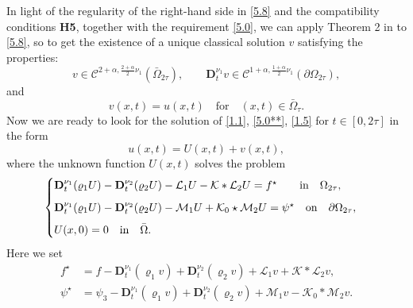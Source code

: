 \documentclass[reqno]{amsart}
\def\C {\mathcal{C}}
\theoremstyle{definition}
\numberwithin{equation}{section}
\begin{document}
In light of the regularity of the right-hand side in \eqref{5.8} and 
the compatibility conditions \textbf{H5},
together with the requirement \eqref{5.0}, we can apply Theorem 2 in \cite{K1} to \eqref{5.8},
so to get the existence of a unique classical solution $v$ satisfying the properties:
\[
v\in\C^{2+\alpha,\frac{2+\alpha}{2}\nu_{1}}(\bar{\Omega}_{2\tau}),\qquad \mathbf{D}_{t}^{\nu_{1}}v\in\C^{1+\alpha,\frac{1+\alpha}{2}\nu_{1}}(\partial\Omega_{2\tau}),
\]
and
\[
v(x,t)= u(x,t)\quad\text{for}\quad (x,t)\in\bar{\Omega}_{\tau}.
\]
Now we are ready to look for the solution of \eqref{1.1}, \eqref{5.0**}, \eqref{1.5} for $t\in[0,2\tau]$ in the form
\[
u(x,t)=U(x,t)+v(x,t),
\]
where the unknown function $U(x,t)$ solves the problem
\begin{equation}\label{5.9}
\begin{cases}
\mathbf{D}_{t}^{\nu_{1}}(\varrho_{1}U)-\mathbf{D}_{t}^{\nu_2}(\varrho_{2} U)-\mathcal{L}_{1}U-\mathcal{K}*\mathcal{L}_{2}U
=
f^{\star}\qquad \text{in}\quad \Omega_{2\tau},\\
\noalign{\vskip2mm}
\mathbf{D}_{t}^{\nu_{1}}(\varrho_{1}U)-\mathbf{D}_{t}^{\nu_2}(\varrho_2 U)-\mathcal{M}_{1}U+\mathcal{K}_{0}\star\mathcal{M}_{2}U
=\psi^{\star}\quad\text{on}\quad\partial\Omega_{2\tau},\\
\noalign{\vskip2mm}
U(x,0)=0\quad\text{in}\quad\bar{\Omega}.
\end{cases}
\end{equation}
Here we set
\begin{align*}
f^{\star}&=f-
\mathbf{D}_{t}^{\nu_{1}}(\varrho_{1}v)+\mathbf{D}_{t}^{\nu_2}(\varrho_2 v)+\mathcal{L}_{1}v+\mathcal{K}*\mathcal{L}_{2}v,\\
\psi^{\star}&=\psi_{3}-\mathbf{D}_{t}^{\nu_1}(\varrho_{1}v)+\mathbf{D}_{t}^{\nu_2}(\varrho_2 v)+\mathcal{M}_{1}v-\mathcal{K}_{0}*\mathcal{M}_{2}v.
\end{align*}
\end{document}
